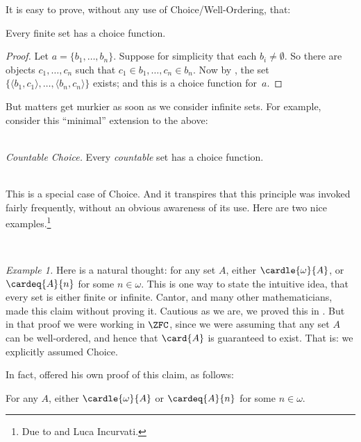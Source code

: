 \documentclass[../../../include/open-logic-section]{subfiles}
\begin{document}

It is easy to prove, without any use of Choice/Well-Ordering, that:

\begin{lem}[in $\Zminus$]
Every finite set has a choice function. 
\end{lem}

\begin{proof}
Let $a = \{b_1, \ldots, b_n\}$. Suppose for simplicity that each $b_i
\neq \emptyset$. So there are objects $c_1, \ldots, c_n$ such that
$c_1 \in b_1, \ldots, c_n \in b_n$. Now by
, the set $\{\langle b_1,
c_1\rangle , \ldots, \langle b_n, c_n\rangle\}$ exists; and this is a
choice function for~$a$.
\end{proof}

But matters get murkier as soon as we consider infinite sets. For
example, consider this ``minimal'' extension to the above:

\
\\\emph{Countable Choice.} Every \emph{countable} set has a choice function. 

\
\\
This is a special case of Choice. And it transpires that this
principle was invoked fairly frequently, without  an obvious awareness
of its use. Here are two nice examples.\footnote{Due to
\citet[\S9.4]{Potter2004} and Luca Incurvati.}


\

\emph{Example 1.} 
Here is a natural thought: for any set $A$, either
$\cardle{\omega}{A}$, or $\cardeq{A}{n}$ for some $n \in \omega$. This
is one way to state the intuitive idea, that every set is either
finite or infinite. Cantor, and many other mathematicians, made this
claim without proving it. Cautious as we are, we proved this in
\olref[cardinals][classing]{generalinfinitycharacter}. But
in that proof we were working in $\ZFC$, since we were assuming that
any set $A$ can be well-ordered, and hence that $\card{A}$ is
guaranteed to exist. That is: we explicitly assumed Choice.

In fact, \citet{Dedekind1888} offered his own proof of
this claim, as follows:

\begin{thm}
For any $A$, either $\cardle{\omega}{A}$ or $\cardeq{A}{n}$ for some
$n \in \omega$.
\end{thm}
\end{document}
